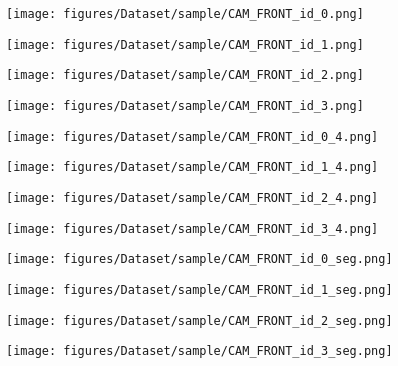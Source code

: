 \documentclass{article}
\begin{document}
\begin{figure*}[]
    \centering
    \vspace{2mm}
\begin{subfigure}[b]{0.245\textwidth}
        \centering
        \texttt{[image: figures/Dataset/sample/CAM\_FRONT\_id\_0.png]}
    \end{subfigure}
    \hfill
    \begin{subfigure}[b]{0.245\textwidth}
        \centering
        \texttt{[image: figures/Dataset/sample/CAM\_FRONT\_id\_1.png]}
    \end{subfigure}
    \hfill
    \begin{subfigure}[b]{0.245\textwidth}
        \centering
        \texttt{[image: figures/Dataset/sample/CAM\_FRONT\_id\_2.png]}
    \end{subfigure}
    \hfill
    \begin{subfigure}[b]{0.245\textwidth}
        \centering
        \texttt{[image: figures/Dataset/sample/CAM\_FRONT\_id\_3.png]}
    \end{subfigure}
    
    \centering
\begin{subfigure}[b]{0.245\textwidth}
        \centering
        \texttt{[image: figures/Dataset/sample/CAM\_FRONT\_id\_0\_4.png]}
    \end{subfigure}
    \hfill
    \begin{subfigure}[b]{0.245\textwidth}
        \centering
        \texttt{[image: figures/Dataset/sample/CAM\_FRONT\_id\_1\_4.png]}
    \end{subfigure}
    \hfill
    \begin{subfigure}[b]{0.245\textwidth}
        \centering
        \texttt{[image: figures/Dataset/sample/CAM\_FRONT\_id\_2\_4.png]}
    \end{subfigure}
    \hfill
    \begin{subfigure}[b]{0.245\textwidth}
        \centering
        \texttt{[image: figures/Dataset/sample/CAM\_FRONT\_id\_3\_4.png]}
    \end{subfigure}
    
    
    \centering
\begin{subfigure}[b]{0.245\textwidth}
        \centering
        \texttt{[image: figures/Dataset/sample/CAM\_FRONT\_id\_0\_seg.png]}
    \end{subfigure}
    \hfill
    \begin{subfigure}[b]{0.245\textwidth}
        \centering
        \texttt{[image: figures/Dataset/sample/CAM\_FRONT\_id\_1\_seg.png]}
    \end{subfigure}
    \hfill
    \begin{subfigure}[b]{0.245\textwidth}
        \centering
        \texttt{[image: figures/Dataset/sample/CAM\_FRONT\_id\_2\_seg.png]}
    \end{subfigure}
    \hfill
    \begin{subfigure}[b]{0.245\textwidth}
        \centering
        \texttt{[image: figures/Dataset/sample/CAM\_FRONT\_id\_3\_seg.png]}
    \end{subfigure}
    

\end{figure*}
\end{document}
